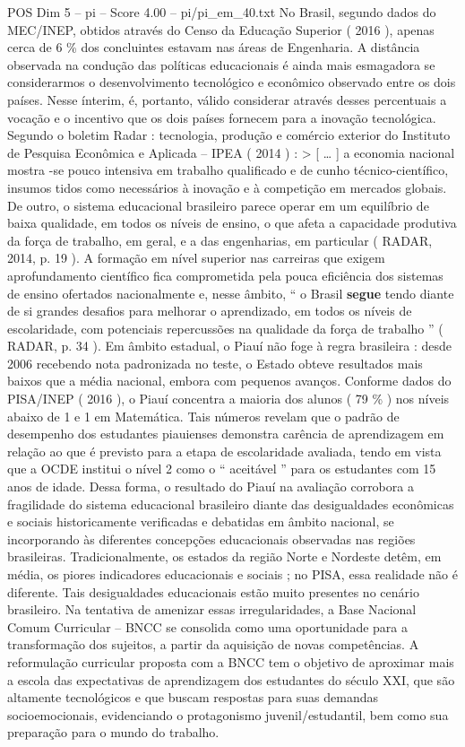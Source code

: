 \begin{textsample}{POS Dim 5 – pi – Score 4.00 – pi/pi\_em\_40.txt}
No Brasil, segundo dados do MEC/INEP, obtidos através do Censo da Educação Superior ( 2016 ), apenas cerca de 6 \% dos concluintes estavam nas áreas de Engenharia.
A distância observada na condução das políticas educacionais é ainda mais esmagadora se considerarmos o desenvolvimento tecnológico e econômico observado entre os dois países.
Nesse ínterim, é, portanto, válido considerar através desses percentuais a vocação e o incentivo que os dois países fornecem para a inovação tecnológica.
Segundo o boletim Radar : tecnologia, produção e comércio exterior do Instituto de Pesquisa Econômica e Aplicada – IPEA ( 2014 ) : > [ … ] a economia nacional mostra -se pouco intensiva em trabalho qualificado e de cunho técnico-científico, insumos tidos como necessários à inovação e à competição em mercados globais.
De outro, o sistema educacional brasileiro parece operar em um equilíbrio de baixa qualidade, em todos os níveis de ensino, o que afeta a capacidade produtiva da força de trabalho, em geral, e a das engenharias, em particular ( RADAR, 2014, p. 19 ).
A formação em nível superior nas carreiras que exigem aprofundamento científico fica comprometida pela pouca eficiência dos sistemas de ensino ofertados nacionalmente e, nesse âmbito, “ o Brasil \textbf{segue} tendo diante de si grandes desafios para melhorar o aprendizado, em todos os níveis de escolaridade, com potenciais repercussões na qualidade da força de trabalho ” ( RADAR, p. 34 ).
Em âmbito estadual, o Piauí não foge à regra brasileira : desde 2006 recebendo nota padronizada no teste, o Estado obteve resultados mais baixos que a média nacional, embora com pequenos avanços.
Conforme dados do PISA/INEP ( 2016 ), o Piauí concentra a maioria dos alunos ( 79 \% ) nos níveis abaixo de 1 e 1 em Matemática.
Tais números revelam que o padrão de desempenho dos estudantes piauienses demonstra carência de aprendizagem em relação ao que é previsto para a etapa de escolaridade avaliada, tendo em vista que a OCDE institui o nível 2 como o “ aceitável ” para os estudantes com 15 anos de idade.
Dessa forma, o resultado do Piauí na avaliação corrobora a fragilidade do sistema educacional brasileiro diante das desigualdades econômicas e sociais historicamente verificadas e debatidas em âmbito nacional, se incorporando às diferentes concepções educacionais observadas nas regiões brasileiras.
Tradicionalmente, os estados da região Norte e Nordeste detêm, em média, os piores indicadores educacionais e sociais ; no PISA, essa realidade não é diferente.
Tais desigualdades educacionais estão muito presentes no cenário brasileiro.
Na tentativa de amenizar essas irregularidades, a Base Nacional Comum Curricular – BNCC se consolida como uma oportunidade para a transformação dos sujeitos, a partir da aquisição de novas competências.
A reformulação curricular proposta com a BNCC tem o objetivo de aproximar mais a escola das expectativas de aprendizagem dos estudantes do século XXI, que são altamente tecnológicos e que buscam respostas para suas demandas socioemocionais, evidenciando o protagonismo juvenil/estudantil, bem como sua preparação para o mundo do trabalho.

\end{textsample}
